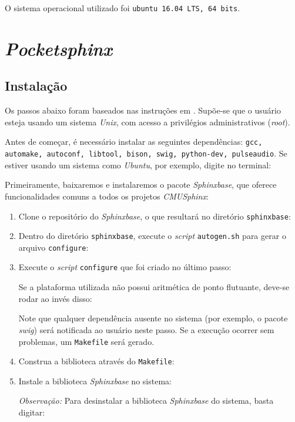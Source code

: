 O sistema operacional utilizado foi \texttt{ubuntu 16.04 LTS, 64 bits}.


\section{\emph{Pocketsphinx}}

\subsection{Instalação}

Os passos abaixo foram baseados nas instruções em \citep{pocketsphinxInstall}. Supõe-se que o usuário esteja usando um sistema \emph{Unix}, com acesso a privilégios administrativos (\emph{root}).

Antes de começar, é necessário instalar as seguintes dependências: \texttt{gcc, automake, autoconf, libtool, bison, swig, python-dev, pulseaudio}. Se estiver usando um sistema como \emph{Ubuntu}, por exemplo, digite no terminal:

Primeiramente, baixaremos e instalaremos o pacote \emph{Sphinxbase}, que oferece funcionalidades comuns a todos os projetos \emph{CMUSphinx}:

\begin{enumerate}
\item Clone o repositório do \emph{Sphinxbase}, o que resultará no diretório \texttt{sphinxbase}:

\item Dentro do diretório \texttt{sphinxbase}, execute o \emph{script} \texttt{autogen.sh} para gerar o arquivo \texttt{configure}:

\item Execute o \emph{script} \texttt{configure} que foi criado no último passo:

Se a plataforma utilizada não possui aritmética de ponto flutuante, deve-se rodar ao invés disso:

Note que qualquer dependência ausente no sistema (por exemplo, o pacote \emph{swig}) será notificada ao usuário neste passo. Se a execução ocorrer sem problemas, um \texttt{Makefile} será gerado.

\item Construa a biblioteca através do \texttt{Makefile}:

\item Instale a biblioteca \emph{Sphinxbase} no sistema:

\emph{Observação:} Para desinstalar a biblioteca \emph{Sphinxbase} do sistema, basta digitar:
\end{enumerate}

